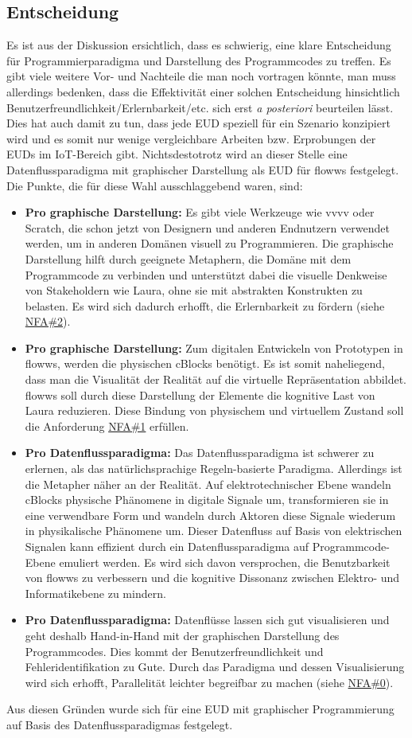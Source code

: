 \subsection{Entscheidung}
Es ist aus der Diskussion ersichtlich, dass es schwierig, eine klare Entscheidung für Programmierparadigma und Darstellung des Programmcodes zu treffen. Es gibt viele weitere Vor- und Nachteile die man noch vortragen könnte, man muss allerdings bedenken, dass die Effektivität einer solchen Entscheidung hinsichtlich Benutzerfreundlichkeit/Erlernbarkeit/etc. sich erst \textit{a posteriori} beurteilen lässt. Dies hat auch damit zu tun, dass jede \ac{EUD} speziell für ein Szenario konzipiert wird und es somit nur wenige vergleichbare Arbeiten bzw. Erprobungen der \acp{EUD} im \ac{IoT}-Bereich gibt. Nichtsdestotrotz wird an dieser Stelle eine Datenflussparadigma mit graphischer Darstellung als \ac{EUD} für flowws festgelegt. Die Punkte, die für diese Wahl ausschlaggebend waren, sind:
\begin{itemize}
    \item \textbf{Pro graphische Darstellung:} Es gibt viele Werkzeuge wie vvvv oder Scratch, die schon jetzt von Designern und anderen Endnutzern verwendet werden, um in anderen Domänen visuell zu Programmieren. Die graphische Darstellung hilft durch geeignete Metaphern, die Domäne mit dem Programmcode zu verbinden und unterstützt dabei die visuelle Denkweise von Stakeholdern wie Laura, ohne sie mit abstrakten Konstrukten zu belasten. Es wird sich dadurch erhofft, die Erlernbarkeit zu fördern (siehe \hyperref[tab:NFA2]{NFA\#2}).
    \item \textbf{Pro graphische Darstellung:} Zum digitalen Entwickeln von Prototypen in flowws, werden die physischen cBlocks benötigt. Es ist somit naheliegend, dass man die Visualität der Realität auf die virtuelle Repräsentation abbildet. flowws soll durch diese Darstellung der Elemente die kognitive Last von Laura reduzieren. Diese Bindung von physischem und virtuellem Zustand soll die Anforderung  \hyperref[tab:NFA1]{NFA\#1} erfüllen.
    \item \textbf{Pro Datenflussparadigma:} Das Datenflussparadigma ist schwerer zu erlernen, als das natürlichsprachige Regeln-basierte Paradigma. Allerdings ist die Metapher näher an der Realität. Auf elektrotechnischer Ebene wandeln cBlocks physische Phänomene in digitale Signale um, transformieren sie in eine verwendbare Form und wandeln durch Aktoren diese Signale wiederum in physikalische Phänomene um. Dieser Datenfluss auf Basis von elektrischen Signalen kann effizient durch ein Datenflussparadigma auf Programmcode-Ebene emuliert werden. Es wird sich davon versprochen, die Benutzbarkeit von flowws zu verbessern und die kognitive Dissonanz zwischen Elektro- und Informatikebene zu mindern.
    \item \textbf{Pro Datenflussparadigma:} Datenflüsse lassen sich gut visualisieren und  geht deshalb Hand-in-Hand mit der graphischen Darstellung des Programmcodes. Dies kommt der Benutzerfreundlichkeit und Fehleridentifikation zu Gute. Durch das Paradigma und dessen Visualisierung wird sich erhofft, Parallelität leichter begreifbar zu machen (siehe \hyperref[tab:NFA0]{NFA\#0}).
\end{itemize}

Aus diesen Gründen wurde sich für eine \ac{EUD} mit graphischer Programmierung auf Basis des Datenflussparadigmas festgelegt.
